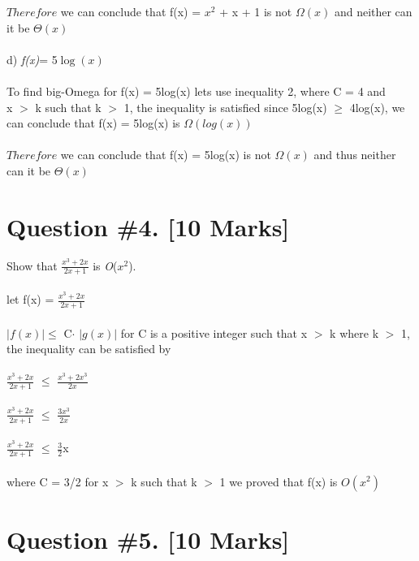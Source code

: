 \documentclass{article}
\begin{document}
$Therefore$ we can conclude that f(x) = $x^2$ + x + 1 is not $\Omega(x)$ and neither can it be $\Theta(x)$ \\ \\ 
d) \textit{f(x)}= 5$\log(x)$ \\ \\ 
To find big-Omega for f(x) = 5log(x)  lets use inequality 2, where C = 4 and \\ x $>$ k such that k $>$ 1, the inequality is satisfied since 5log(x) $\geq$ 4log(x), we can conclude that f(x) =  5log(x) is $\Omega(log(x))$ \\\\
$Therefore$ we can conclude that f(x) = 5log(x) is not $\Omega(x)$ and thus neither can it be $\Theta(x)$

\section{Question \#4. [10 Marks]}
Show that $\frac{x^3 + 2x}{2x + 1}$ is \emph{O}($x^2$).\\ \\ 
let f(x) = $\frac{x^3 + 2x}{2x + 1}$\\\\
$\left| f(x) \right|$$\leq$ C$\cdot$ $\left| g(x) \right|$ for C is a positive integer such that x $>$ k where k $>$ 1, the inequality can be satisfied by\\\\
$\frac{x^3 + 2x}{2x + 1}$ $\leq$ $\frac{x^3 + 2x^3}{2x}$ \\\\
$\frac{x^3 + 2x}{2x + 1}$ $\leq$ $\frac{3x^3}{2x}$ \\\\
$\frac{x^3 + 2x}{2x + 1}$ $\leq$ $\frac{3}{2}$x \\\\
where C = 3/2 for x $>$ k such that k $>$ 1 we proved that f(x) is $O(x^2)$

\newpage


\section{Question \#5. [10 Marks]}
\end{document}
